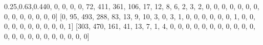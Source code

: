 \documentclass[
]{article}
\newenvironment{Shaded}{}{}
\newcommand{\DecValTok}[1]{\textcolor[rgb]{0.25,0.63,0.44}{#1}}
\newcommand{\NormalTok}[1]{#1}
\begin{document}
\begin{Shaded}
\begin{Highlighting}[]
\NormalTok{[}\DecValTok{0}\NormalTok{, }\DecValTok{0}\NormalTok{, }\DecValTok{0}\NormalTok{, }\DecValTok{0}\NormalTok{, }\DecValTok{0}\NormalTok{, }\DecValTok{72}\NormalTok{, }\DecValTok{411}\NormalTok{, }\DecValTok{361}\NormalTok{, }\DecValTok{106}\NormalTok{, }\DecValTok{17}\NormalTok{, }\DecValTok{12}\NormalTok{, }\DecValTok{8}\NormalTok{, }\DecValTok{6}\NormalTok{, }\DecValTok{2}\NormalTok{, }\DecValTok{3}\NormalTok{, }\DecValTok{2}\NormalTok{, }\DecValTok{0}\NormalTok{, }\DecValTok{0}\NormalTok{, }\DecValTok{0}\NormalTok{, }\DecValTok{0}\NormalTok{, }\DecValTok{0}\NormalTok{, }\DecValTok{0}\NormalTok{, }\DecValTok{0}\NormalTok{, }\DecValTok{0}\NormalTok{, }\DecValTok{0}\NormalTok{, }\DecValTok{0}\NormalTok{, }\DecValTok{0}\NormalTok{, }\DecValTok{0}\NormalTok{, }\DecValTok{0}\NormalTok{, }\DecValTok{0}\NormalTok{]}
\NormalTok{[}\DecValTok{0}\NormalTok{, }\DecValTok{95}\NormalTok{, }\DecValTok{493}\NormalTok{, }\DecValTok{288}\NormalTok{, }\DecValTok{83}\NormalTok{, }\DecValTok{13}\NormalTok{, }\DecValTok{9}\NormalTok{, }\DecValTok{10}\NormalTok{, }\DecValTok{3}\NormalTok{, }\DecValTok{0}\NormalTok{, }\DecValTok{3}\NormalTok{, }\DecValTok{1}\NormalTok{, }\DecValTok{0}\NormalTok{, }\DecValTok{0}\NormalTok{, }\DecValTok{0}\NormalTok{, }\DecValTok{0}\NormalTok{, }\DecValTok{0}\NormalTok{, }\DecValTok{0}\NormalTok{, }\DecValTok{1}\NormalTok{, }\DecValTok{0}\NormalTok{, }\DecValTok{0}\NormalTok{, }\DecValTok{0}\NormalTok{, }\DecValTok{0}\NormalTok{, }\DecValTok{0}\NormalTok{, }\DecValTok{0}\NormalTok{, }\DecValTok{0}\NormalTok{, }\DecValTok{0}\NormalTok{, }\DecValTok{0}\NormalTok{, }\DecValTok{0}\NormalTok{, }\DecValTok{1}\NormalTok{]}
\NormalTok{[}\DecValTok{303}\NormalTok{, }\DecValTok{470}\NormalTok{, }\DecValTok{161}\NormalTok{, }\DecValTok{41}\NormalTok{, }\DecValTok{13}\NormalTok{, }\DecValTok{7}\NormalTok{, }\DecValTok{1}\NormalTok{, }\DecValTok{4}\NormalTok{, }\DecValTok{0}\NormalTok{, }\DecValTok{0}\NormalTok{, }\DecValTok{0}\NormalTok{, }\DecValTok{0}\NormalTok{, }\DecValTok{0}\NormalTok{, }\DecValTok{0}\NormalTok{, }\DecValTok{0}\NormalTok{, }\DecValTok{0}\NormalTok{, }\DecValTok{0}\NormalTok{, }\DecValTok{0}\NormalTok{, }\DecValTok{0}\NormalTok{, }\DecValTok{0}\NormalTok{, }\DecValTok{0}\NormalTok{, }\DecValTok{0}\NormalTok{, }\DecValTok{0}\NormalTok{, }\DecValTok{0}\NormalTok{, }\DecValTok{0}\NormalTok{, }\DecValTok{0}\NormalTok{, }\DecValTok{0}\NormalTok{, }\DecValTok{0}\NormalTok{, }\DecValTok{0}\NormalTok{, }\DecValTok{0}\NormalTok{]}
\end{Highlighting}
\end{Shaded}
\end{document}

